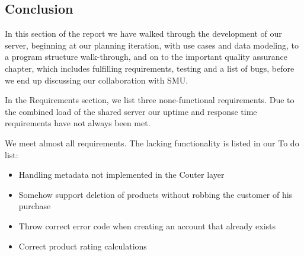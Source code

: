 \subsection{Conclusion}
In this section of the report we have walked through the development of our server, beginning at our planning iteration, with use cases and data modeling, to a program structure walk-through, and on to the important quality assurance chapter, which includes fulfilling requirements, testing and a list of bugs, before we end up discussing our collaboration with SMU.

In the Requirements section, we list three none-functional requirements. Due to the combined load of the shared server our uptime and response time requirements have not always been met.

We meet almost all requirements. The lacking functionality is listed in our To do list:
\begin{itemize}
\item Handling metadata not implemented in the C\Sh outer layer
\item Somehow support deletion of products without robbing the customer of his purchase
\item Throw correct error code when creating an account that already exists
\item Correct product rating calculations
\end{itemize}

\newpage